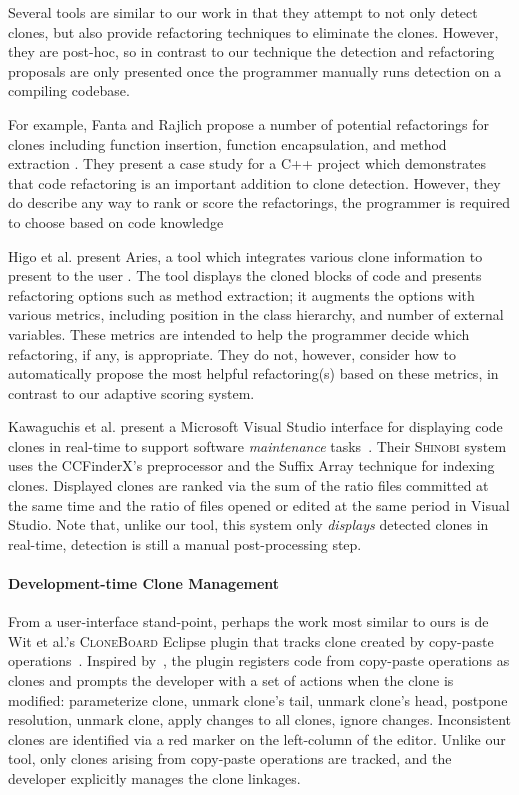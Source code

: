 \documentclass[nocopyrightspace,10pt]{sigplanconf}
\newcommand{\todo}[1]{{\bfseries [[#1]]}}
\renewcommand{\todo}[1]{\relax}
\begin{document}
Several tools are similar to our work in that they attempt to not only
detect clones, but also provide refactoring techniques to eliminate the clones.  However,
they are post-hoc, so in contrast to our technique
 the detection and refactoring proposals are only presented once the 
programmer manually runs detection on a compiling codebase.

For example, Fanta and Rajlich propose a number of
potential refactorings for clones including function insertion, function encapsulation,
and method extraction \cite{Fanta1999}.  They 
present a case study for a C++ project which demonstrates that code refactoring is an important 
addition to clone detection. However, they do describe any way to rank or score the refactorings,
the programmer is required to choose based on code knowledge

Higo et al. present Aries, a tool which integrates various clone
information to present to the user \cite{Higo2008}.  The tool displays the
cloned blocks of code and presents refactoring options such as method
extraction; it augments the options with various metrics, including position in
the class hierarchy, and number of external variables. These metrics
are intended to help the programmer decide which refactoring, if any,
is appropriate. They do not, however, consider how to automatically 
propose the most helpful refactoring(s) based on these metrics, in contrast 
to our adaptive scoring system.

Kawaguchis et al. present a  
Microsoft Visual Studio interface for
displaying code clones in real-time to support software
\emph{maintenance} tasks~\cite{Kawaguchi2009,Yamashina2008}. Their
\textsc{Shinobi} system uses the CCFinderX's preprocessor and the Suffix Array
technique for indexing clones. Displayed clones are ranked via the sum
of the ratio files committed at the same time and the ratio of files
opened or edited at the same period in Visual Studio. Note that, unlike our tool,
 this system only \emph{displays} detected clones in real-time, detection is still
 a manual post-processing step.

\paragraph{Development-time Clone Management}

From a user-interface stand-point, perhaps the work most similar to
ours is de Wit et al.'s \textsc{CloneBoard} Eclipse plugin that tracks
clone created by copy-paste operations~\cite{deWit2009}. Inspired
by~\cite{Mann2006}, the plugin registers code from copy-paste
operations as clones and prompts the developer with a set of actions
when the clone is modified: parameterize clone, unmark clone's tail,
unmark clone's head, postpone resolution, unmark clone, apply changes
to all clones, ignore changes. Inconsistent clones are identified via
a red marker on the left-column of the editor. Unlike our tool, only
clones arising from copy-paste operations are tracked, and the
developer explicitly manages the clone linkages.
\end{document}
